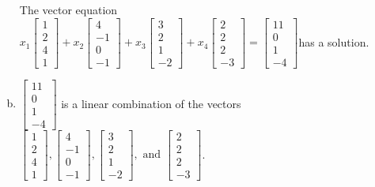 \begin{exerciseAnswer}
\begin{enumerate}[(a)]
\begin{center}
\begin{minipage}{0.8\textwidth}
 The vector equation \( x_{1} \left[\begin{array}{c}
1 \\
2 \\
4 \\
1
\end{array}\right] + x_{2} \left[\begin{array}{c}
4 \\
-1 \\
0 \\
-1
\end{array}\right] + x_{3} \left[\begin{array}{c}
3 \\
2 \\
1 \\
-2
\end{array}\right] + x_{4} \left[\begin{array}{c}
2 \\
2 \\
2 \\
-3
\end{array}\right] = \left[\begin{array}{c}
11 \\
0 \\
1 \\
-4
\end{array}\right] \)has a solution.
\end{minipage}\end{center}
    
\item 

\( \left[\begin{array}{c}
11 \\
0 \\
1 \\
-4
\end{array}\right] \) is a linear combination of the vectors \( \left[\begin{array}{c}
1 \\
2 \\
4 \\
1
\end{array}\right] , \left[\begin{array}{c}
4 \\
-1 \\
0 \\
-1
\end{array}\right] , \left[\begin{array}{c}
3 \\
2 \\
1 \\
-2
\end{array}\right] , \text{ and } \left[\begin{array}{c}
2 \\
2 \\
2 \\
-3
\end{array}\right] \). 


\end{enumerate}
    
\end{exerciseAnswer}
    
